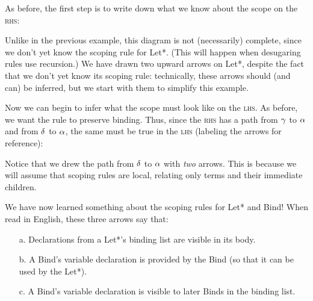 As before, the first step is to write down what we know about the
scope on the \textsc{rhs}:
\begin{center}
\end{center}
Unlike in the previous example, this diagram is not (necessarily)
complete, since we don't yet know the scoping rule for
Let*. (This will happen when desugaring rules use recursion.)
We have drawn two upward arrows on Let*, despite the fact that we
don't yet know its scoping rule: technically, these arrows should
(and can) be inferred, but we start with them to simplify this example.

Now we can begin to infer what the scope must look like on the
\textsc{lhs}. As before, we want the rule to preserve
binding. Thus, since the \textsc{rhs} has a path from $\gamma$ to
$\alpha$ and from $\delta$ to $\alpha$, the same must be true in the
\textsc{lhs} (labeling the arrows for reference):
\begin{center}
\end{center}
Notice that we drew the path from $\delta$ to $\alpha$ with \emph{two}
arrows. This is because we will assume that scoping rules are local,
relating only terms and their immediate children.

We have now learned something about the scoping rules for Let* and
Bind! When read in English, these three arrows say that:
\begin{enumerate}
\item[a.] Declarations from a Let*'s binding list are visible in its body.
\item[b.] A Bind's variable declaration is provided by the Bind (so
  that it can be used by the Let*).
\item[c.] A Bind's variable declaration is visible to later Binds in the
  binding list.
\end{enumerate}

